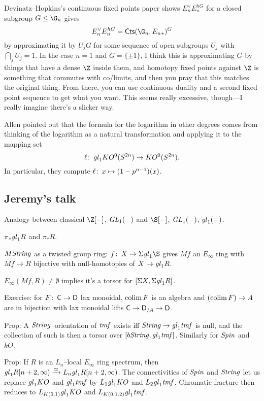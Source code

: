 Devinatz--Hopkins's continuous fixed points paper shows $E_n^\vee E_n^{hG}$ for a closed subgroup $G \le \G_n$ gives \[E_n^\vee E_n^{hG} = \CatOf{Cts}(\G_n, E_n{}_*)^G\] by approximating it by $U_j G$ for some sequence of open subgroups $U_j$ with $\bigcap_j U_j = 1$.  In the case $n = 1$ and $G = \{\pm 1\}$, I think this is approximating $G$ by things that have a dense $\Z$ inside them, and homotopy fixed points against $\Z$ is something that commutes with co/limits, and then you pray that this matches the original thing.  From there, you can use continuous duality and a second fixed point sequence to get what you want.  This seems really excessive, though---I really imagine there's a slicker way.







Allen pointed out that the formula for the logarithm in other degrees comes from thinking of the logarithm as a natural transformation and applying it to the mapping set \[\ell\colon\thinspace \mathit{gl}_1 KO^0(S^{2n}) \to KO^0(S^{2n}).\]  In particular, they compute $\ell\colon\thinspace x \mapsto (1 - p^{n-1})(x)$.





\subsection{Jeremy's talk}

Analogy between classical $\Z[-]$, $\mathit{GL}_1(-)$ and $\S[-]$, $\mathit{GL}_1(-)$, $\mathit{gl}_1(-)$.

$\pi_* \mathit{gl}_1 R$ and $\pi_* R$.

$M\mathit{String}$ as a twisted group ring: $f\co X \to \Susp \gl_1 \S$ gives $Mf$ an $E_\infty$ ring with $Mf \to R$ bijective with null-homotopies of $X \to \mathit{gl}_1 R$.

$E_\infty(Mf, R) \ne \emptyset$ implies it's a torsor for $[\Sigma X, \Sigma \mathit{gl}_1 R]$.

Exercise: for $F\colon\thinspace \mathsf{C} \to \mathsf{D}$ lax monoidal, $\operatorname*{colim} F$ is an algebra and $(\operatorname*{colim} F) \to A$ are in bijection with lax monoidal lifts $\mathsf{C} \to \mathsf{D}_{/A} \to \mathsf{D}$.

Prop: A $\mathit{String}$--orientation of $\mathit{tmf}$ exists iff $\mathit{String} \to \mathit{gl}_1 \mathit{tmf}$ is null, and the collection of such is then a torsor over $[b\mathit{String}, \mathit{gl}_1 \mathit{tmf}]$.  Similarly for $\mathit{Spin}$ and $kO$.

Prop: If $R$ is an $L_n$--local $E_\infty$ ring spectrum, then $\mathit{gl}_1 R[n+2, \infty) \xrightarrow{\simeq} L_n \mathit{gl}_1 R[n+2, \infty)$.  The connectivities of $\mathit{Spin}$ and $\mathit{String}$ let us replace $\mathit{gl}_1 KO$ and $\mathit{gl}_1 \mathit{tmf}$ by $L_1 \mathit{gl}_1 KO$ and $L_2 \mathit{gl}_1 \mathit{tmf}$.  Chromatic fracture then reduces to $L_{K(0, 1)} \mathit{gl}_1 KO$ and $L_{K(0, 1. 2)} \mathit{gl}_1 \mathit{tmf}$.

